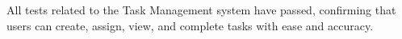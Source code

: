 \documentclass[12pt, titlepage]{article}
\begin{document}
All tests related to the Task Management system have passed, confirming that users can create, assign, view, and complete tasks with ease and accuracy.



					
					
					


					

					
					
					



					
					
					




					
					

\end{document}
